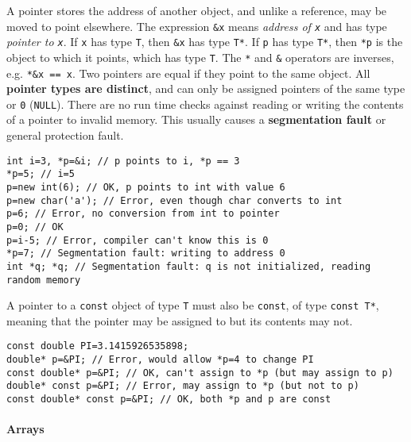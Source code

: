 			A pointer stores the address of another object, and unlike a reference, may be moved to point elsewhere. The expression \lstinline!&x! means \emph{address of \lstinline!x!} and has type \emph{pointer to \lstinline!x!}. If \lstinline!x! has type \lstinline!T!, then \lstinline!&x! has type \lstinline!T*!. If \lstinline!p! has type \lstinline!T*!, then \lstinline!*p! is the object to which it points, which has type \lstinline!T!. The \lstinline!*! and \lstinline!&! operators are inverses, e.g. \lstinline!*&x == x!.
			Two pointers are equal if they point to the same object. All \textbf{pointer types are distinct}, and can only be assigned pointers of the same type or \lstinline!0! (\lstinline!NULL!). There are no run time checks against reading or writing the contents of a pointer to invalid memory. This usually causes a \textbf{segmentation fault} or general protection fault.
			\begin{code}\begin{lstlisting}[style=list]
int i=3, *p=&i; // p points to i, *p == 3
*p=5; // i=5
p=new int(6); // OK, p points to int with value 6
p=new char('a'); // Error, even though char converts to int
p=6; // Error, no conversion from int to pointer
p=0; // OK
p=i-5; // Error, compiler can't know this is 0
*p=7; // Segmentation fault: writing to address 0
int *q; *q; // Segmentation fault: q is not initialized, reading random memory
			\end{lstlisting}\end{code}
			
			\newpage
			A pointer to a \lstinline!const! object of type \lstinline!T! must also be \lstinline!const!, of type \lstinline!const T*!, meaning that the pointer may be assigned to but its contents may not.
			\begin{code}\begin{lstlisting}[style=list]
const double PI=3.1415926535898;
double* p=&PI; // Error, would allow *p=4 to change PI
const double* p=&PI; // OK, can't assign to *p (but may assign to p)
double* const p=&PI; // Error, may assign to *p (but not to p)
const double* const p=&PI; // OK, both *p and p are const
			\end{lstlisting}\end{code}
			
		
		\paragraph{Arrays} %
			
